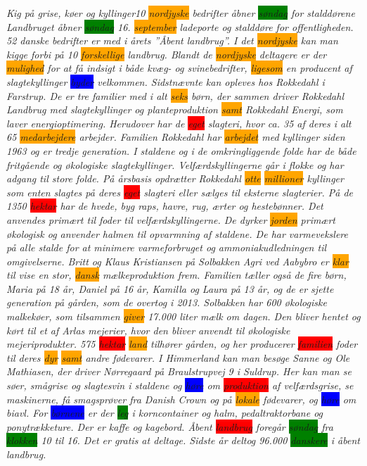 \emph{
Kig på grise, køer og kyllinger10 \colorbox{orange}{nordjyske} bedrifter åbner \colorbox{green}{søndag} for stalddørene Landbruget åbner \colorbox{green}{søndag} 16. \colorbox{orange}{september} ladeporte og stalddøre for offentligheden. 52 danske bedrifter er med i årets ”Åbent landbrug”. I det \colorbox{orange}{nordjyske} kan man kigge forbi på 10 \colorbox{orange}{forskellige} landbrug. Blandt de \colorbox{orange}{nordjyske} deltagere er der \colorbox{orange}{mulighed} for at få indsigt i både kvæg- og svinebedrifter, \colorbox{orange}{ligesom} en producent af slagtekyllinger \colorbox{blue}{byder} velkommen. Sidstnævnte kan opleves hos Rokkedahl i Farstrup. De er tre familier med i alt \colorbox{orange}{seks} børn, der sammen driver Rokkedahl Landbrug med slagtekyllinger og planteproduktion \colorbox{orange}{samt} Rokkedahl Energi, som laver energioptimering. Herudover har de \colorbox{red}{eget} slagteri, hvor ca. 35 af deres i alt 65 \colorbox{orange}{medarbejdere} arbejder. Familien Rokkedahl har \colorbox{orange}{arbejdet} med kyllinger siden 1963 og er tredje generation. I staldene og i de omkringliggende folde har de både fritgående og økologiske slagtekyllinger. Velfærdskyllingerne går i flokke og har adgang til store folde. På årsbasis opdrætter Rokkedahl \colorbox{orange}{otte} \colorbox{orange}{millioner} kyllinger som enten slagtes på deres \colorbox{red}{eget} slagteri eller sælges til eksterne slagterier. På de 1350 \colorbox{red}{hektar} har de hvede, byg raps, havre, rug, ærter og hestebønner. Det anvendes primært til foder til velfærdskyllingerne. De dyrker \colorbox{orange}{jorden} primært økologisk og anvender halmen til opvarmning af staldene. De har varmevekslere på alle stalde for at minimere varmeforbruget og ammoniakudledningen til omgivelserne. Britt og Klaus Kristiansen på Solbakken Agri ved Aabybro er \colorbox{orange}{klar} til vise en stor, \colorbox{orange}{dansk} mælkeproduktion frem. Familien tæller også de fire børn, Maria på 18 år, Daniel på 16 år, Kamilla og Laura på 13 år, og de er sjette generation på gården, som de overtog i 2013. Solbakken har 600 økologiske malkekøer, som tilsammen \colorbox{orange}{giver} 17.000 liter mælk om dagen. Den bliver hentet og kørt til et af Arlas mejerier, hvor den bliver anvendt til økologiske mejeriprodukter. 575 \colorbox{red}{hektar} \colorbox{orange}{land} tilhører gården, og her producerer \colorbox{red}{familien} foder til deres \colorbox{orange}{dyr} \colorbox{orange}{samt} andre fødevarer.  I Himmerland kan man besøge Sanne og Ole Mathiasen, der driver Nørregaard på Braulstrupvej 9 i Suldrup. Her kan man se søer, smågrise og slagtesvin i staldene og \colorbox{blue}{høre} om \colorbox{red}{produktion} af velfærdsgrise, se maskinerne, få smagsprøver fra Danish Crown og på \colorbox{orange}{lokale} fødevarer, og \colorbox{blue}{høre} om biavl. For \colorbox{blue}{børnene} er der \colorbox{green}{leg} i korncontainer og halm, pedaltraktorbane og ponytrækketure. Der er kaffe og kagebord. Åbent \colorbox{red}{landbrug} foregår \colorbox{green}{søndag} fra \colorbox{green}{klokken} 10 til 16. Det er gratis at deltage. Sidste år deltog 96.000 \colorbox{green}{danskere} i åbent landbrug.
}

